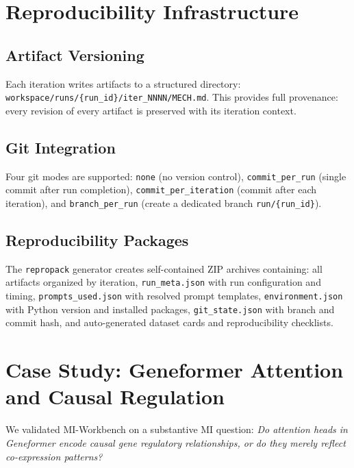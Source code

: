 \documentclass[10pt]{article}
\begin{document}

\section{Reproducibility Infrastructure}
\label{sec:reproducibility}

\subsection{Artifact Versioning}
Each iteration writes artifacts to a structured directory: \texttt{workspace/runs/\{run\_id\}/iter\_NNNN/MECH.md}. This provides full provenance: every revision of every artifact is preserved with its iteration context.

\subsection{Git Integration}
Four git modes are supported: \texttt{none} (no version control), \texttt{commit\_per\_run} (single commit after run completion), \texttt{commit\_per\_iteration} (commit after each iteration), and \texttt{branch\_per\_run} (create a dedicated branch \texttt{run/\{run\_id\}}).

\subsection{Reproducibility Packages}
The \texttt{repropack} generator creates self-contained ZIP archives containing: all artifacts organized by iteration, \texttt{run\_meta.json} with run configuration and timing, \texttt{prompts\_used.json} with resolved prompt templates, \texttt{environment.json} with Python version and installed packages, \texttt{git\_state.json} with branch and commit hash, and auto-generated dataset cards and reproducibility checklists.


\section{Case Study: Geneformer Attention and Causal Regulation}
\label{sec:casestudy}

We validated MI-Workbench on a substantive MI question: \emph{Do attention heads in Geneformer encode causal gene regulatory relationships, or do they merely reflect co-expression patterns?}
\end{document}

